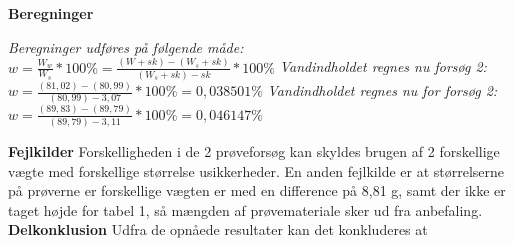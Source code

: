 \textbf{Beregninger}
\begin{center}
\newline
\textit{Beregninger udføres på følgende måde:}
\newline
$w=\frac{W_w}{W_s}*100\%=\frac{(W+sk)-(W_s+sk)}{(W_s+sk)-sk}*100\%$
\newline
\textit{Vandindholdet regnes nu forsøg 2:}
$w=\frac{(81,02)-(80,99)}{(80,99)-3,07}*100\%=0,038501\%$
\newline
\textit{Vandindholdet regnes nu for forsøg 2:}
\newline
$w=\frac{(89,83)-(89,79)}{(89,79)-3,11}*100\%=0,046147\%$
\end{center}
\newline
\newline
\textbf{Fejlkilder}
\newline
Forskelligheden i de 2 prøveforsøg kan skyldes brugen af 2 forskellige vægte med forskellige størrelse usikkerheder. En anden fejlkilde er at størrelserne på prøverne er forskellige vægten er med en difference på 8,81 g, samt der ikke er taget højde for tabel 1, så mængden af prøvemateriale sker ud fra anbefaling.
\newline
\newline
\textbf{Delkonklusion}
\newline
Udfra de opnåede resultater kan det konkluderes at 


